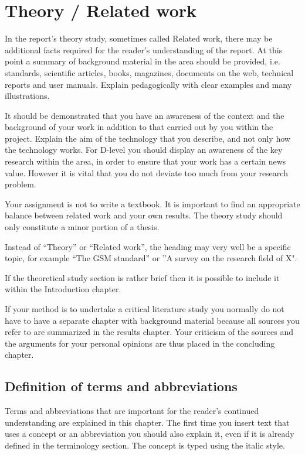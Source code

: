 \section{Theory / Related work}
\label{ch:theory}
\noindent
In the report's theory study, sometimes called Related work, there may be additional facts required for the reader's understanding of the report. At this point a summary of background material in the area should be provided, i.e. standards, scientific articles, books, magazines, documents on the web, technical reports and user manuals. Explain pedagogically with clear examples and many illustrations.

It should be demonstrated that you have an awareness of the context and the background of your work in addition to that carried out by you within the project. Explain the aim of the technology that you describe, and not only how the technology works. For D-level you should display an awareness of the key research within the area, in order to ensure that your work has a certain news value. However it is vital that you do not deviate too much from your research problem.

Your assignment is not to write a textbook. It is important to find an appropriate balance between related work and your own results. The theory study should only constitute a minor portion of a thesis.

Instead of “Theory” or “Related work”, the heading may very well be a specific topic, for example “The GSM standard” or ”A survey on the research field of X".

If the theoretical study section is rather brief then it is possible to include it within the Introduction chapter.

If your method is to undertake a critical literature study you normally do not have to have a separate chapter with background material because all sources you refer to are summarized in the results chapter. Your criticism of the sources and the arguments for your personal opinions are thus placed in the concluding chapter.

\subsection{Definition of terms and abbreviations}
\label{ch:theory:definitions}
Terms and abbreviations that are important for the reader's continued understanding are explained in this chapter. The first time you insert text that uses a concept or an abbreviation you should also explain it, even if it is already defined in the terminology section. The concept is typed using the italic style.

